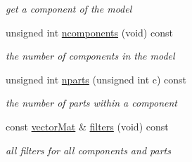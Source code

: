 \begin{DoxyCompactItemize}
\begin{DoxyCompactList}\small\item\em get a component of the model \end{DoxyCompactList}\item 
unsigned int \hyperlink{classParts_ae46aae7dc84e1269f2df268e28dce5cf}{ncomponents} (void) const 
\begin{DoxyCompactList}\small\item\em the number of components in the model \end{DoxyCompactList}\item 
unsigned int \hyperlink{classParts_afd7ff7bce97afbb5a6f781c00e8b2cbc}{nparts} (unsigned int c) const 
\begin{DoxyCompactList}\small\item\em the number of parts within a component \end{DoxyCompactList}\item 
const \hyperlink{types_8hpp_a3207a7addcfa415d1c83622febcb1e9b}{vector\-Mat} \& \hyperlink{classParts_af3e4755656bcd59221ec3b91a79c0201}{filters} (void) const 
\begin{DoxyCompactList}\small\item\em all filters for all components and parts \end{DoxyCompactList}\end{DoxyCompactItemize}
